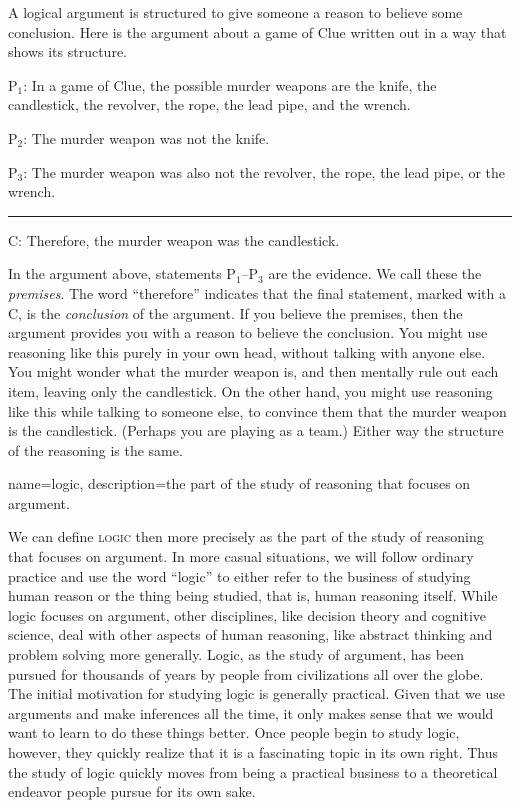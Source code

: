 A logical argument is structured to give someone a reason to believe some conclusion. Here is the argument about a game of Clue written out in a way that shows its structure. 


\label{argClue}
\begin{earg}
\item[P$_1$:] In a game of Clue, the possible murder weapons are the knife, the candlestick, the revolver, the rope, the lead pipe, and the wrench.
\item[P$_2$:] The murder weapon was not the knife.
\item[P$_3$:] The murder weapon was also not the revolver, the rope, the lead pipe, or the wrench.
\vspace{-.5em}
\item [] \rule{0.9\linewidth}{.5pt} 
\item[C:] Therefore, the murder weapon was the candlestick.
\end{earg} 

In the argument above, statements P$_1$--P$_3$ are the evidence. We call these the \emph{premises}. The word ``therefore'' indicates that the final statement, marked with a C, is the \emph{conclusion} of the argument. If you believe the premises, then the argument provides you with a reason to believe the conclusion. You might use reasoning like this purely in your own head, without talking with anyone else. You might wonder what the murder weapon is, and then mentally rule out each item, leaving only the candlestick. On the other hand, you might use reasoning like this while talking to someone else, to convince them that the murder weapon is the candlestick. (Perhaps you are playing as a team.) Either way the structure of the reasoning is the same. 

{
name=logic,
description={the part of the study of reasoning that focuses on argument.}
}

We can define \textsc{\Gls{logic}}\label{def:logic} then more precisely as the part of the study of reasoning that focuses on argument. In more casual situations, we will follow ordinary practice and use the word ``logic'' to either refer to the business of studying human reason or the thing being studied, that is, human reasoning itself. While logic focuses on argument, other disciplines, like decision theory and cognitive science, deal with other aspects of human reasoning, like abstract thinking and problem solving more generally. Logic, as the study of argument, has been pursued for thousands of years by people from civilizations all over the globe. The initial motivation for studying logic is generally practical. Given that we use arguments and make inferences all the time, it only makes sense that we would want to learn to do these things better.  Once people begin to study logic, however, they quickly realize that it is a fascinating topic in its own right. Thus the study of logic quickly moves from being a practical business to a theoretical endeavor people pursue for its own sake. 

